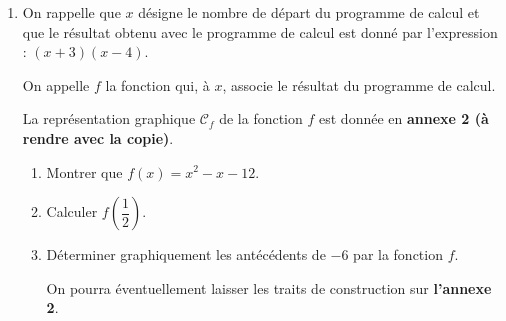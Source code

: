 \documentclass[a4paper,12pt]{article}
\begin{document}
\begin{enumerate}[start=2]
\item On rappelle que $x$ désigne le nombre de départ du programme de calcul et que le résultat obtenu avec le programme de calcul est donné par l'expression : $(x + 3)(x - 4)$.

On appelle $f$ la fonction qui, à $x$, associe le résultat du programme de calcul.

La représentation graphique $\mathcal{C}_f$ de la fonction $f$ est donnée en \textbf{annexe 2 (à rendre avec la copie)}.
  \begin{enumerate}[label=\alph*., itemsep=3pt]
    \item Montrer que $f(x) = x^2 - x - 12$.
    \item Calculer $f\!\left(\dfrac{1}{2}\right)$.
    \item Déterminer graphiquement les antécédents de $-6$ par la fonction $f$.

    On pourra éventuellement laisser les traits de construction sur \textbf{l'annexe 2}.
  \end{enumerate}
\end{enumerate}
\end{document}
